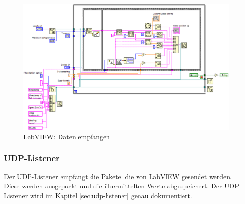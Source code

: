\begin{figure}[H]
\centering 
\includegraphics[angle=90,width=0.9\linewidth]{src/labview_screenshot_videoplayer_daten_empfangen.png}
\caption{LabVIEW: Daten empfangen} %
\label{labview_screenshot_videoplayer_daten_empfangen} %
\end{figure}

\newpage

\subsubsection{UDP-Listener}
Der UDP-Listener empfängt die Pakete, die von LabVIEW gesendet werden. Diese werden ausgepackt und die übermittelten Werte abgespeichert. Der UDP-Listener wird im Kapitel \ref{sec:udp-listener} genau dokumentiert.
